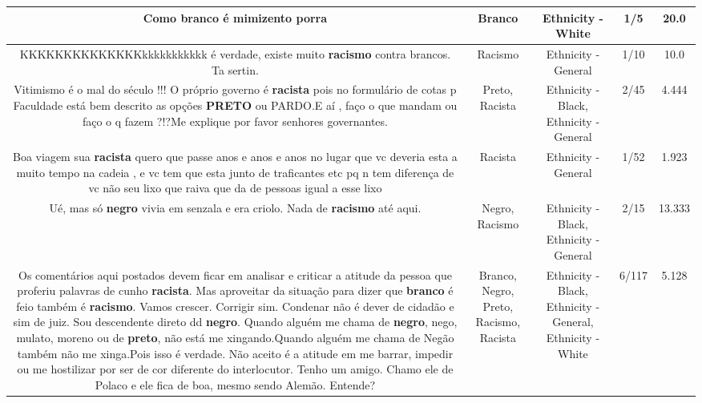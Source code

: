 \documentclass[11pt]{article}
\newlength\mylength
\begin{document}
\begin{center}
\begin{longtable}{|C{.65\mylength}|C{.30\mylength}|C{.12\mylength}|C{.12\mylength}|C{.12\mylength}|}
  \small Como \textbf{branco} é mimizento porra\normalsize   & Branco & Ethnicity - White & 1/5 & 20.0 \\  \hline
  \small KKKKKKKKKKKKKKkkkkkkkkkkk é verdade, existe muito \textbf{racismo} contra brancos. Ta sertin.\normalsize   & Racismo & Ethnicity - General & 1/10 & 10.0 \\  \hline
  \small Vitimismo é o mal do século !!! O próprio governo é \textbf{racista} pois no formulário de cotas p Faculdade está bem descrito as opções \textbf{PRETO} ou PARDO.E aí , faço o que mandam ou faço o q fazem ?!?Me explique por favor senhores governantes.\normalsize   & Preto, Racista & Ethnicity - Black, Ethnicity - General & 2/45 & 4.444 \\  \hline
  \small Boa viagem sua \textbf{racista} quero que passe anos e anos e anos no lugar que vc deveria esta a muito tempo na cadeia , e vc tem que esta junto de traficantes etc pq n tem diferença de vc não seu lixo que raiva que da de pessoas igual a esse lixo\normalsize   & Racista & Ethnicity - General & 1/52 & 1.923 \\  \hline
  \small Ué, mas só \textbf{negro} vivia em senzala e era criolo. Nada de \textbf{racismo} até aqui.\normalsize   & Negro, Racismo & Ethnicity - Black, Ethnicity - General & 2/15 & 13.333 \\  \hline
  \small Os comentários aqui postados devem ficar em analisar e criticar a atitude da pessoa que proferiu palavras de cunho \textbf{racista}. Mas aproveitar da situação para dizer que \textbf{branco} é  feio também é  \textbf{racismo}. Vamos crescer. Corrigir sim. Condenar não  é  dever de cidadão e sim de juiz. Sou descendente direto dd \textbf{negro}. Quando alguém me chama de \textbf{negro}, nego,  mulato,  moreno ou de \textbf{preto}, não  está me xingando.Quando alguém me chama de Negão também não me xinga.Pois isso é verdade. Não  aceito é  a atitude em me barrar, impedir ou me hostilizar por ser de cor diferente do interlocutor. Tenho um amigo. Chamo ele de Polaco e ele fica de boa, mesmo sendo Alemão. Entende?\normalsize   & Branco, Negro, Preto, Racismo, Racista & Ethnicity - Black, Ethnicity - General, Ethnicity - White & 6/117 & 5.128 \\  \hline

\end{longtable}
\end{center}
\end{document}
